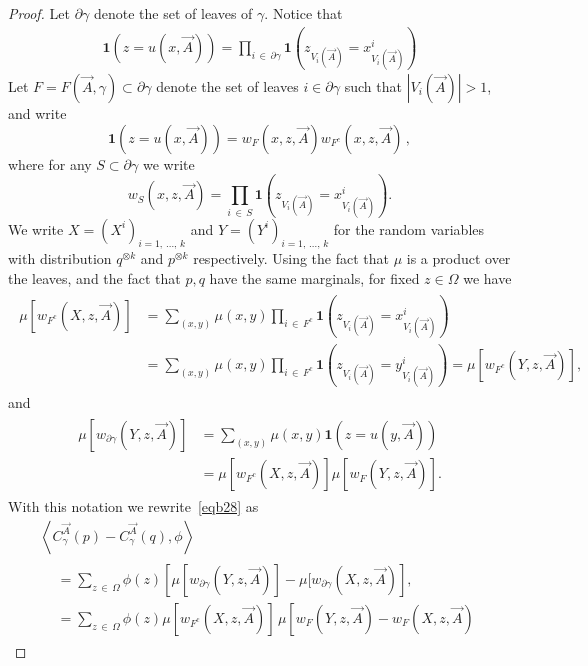 \documentclass[AHL,Unicode,longabstracts,published]{cedram}
\newcommand{\ind}{\mathbf{1}}
\let\g=\gamma
\let\O=\Omega
\begin{document}
\begin{proof}
Let $\partial\g$ denote the set of leaves of $\g$. Notice that
\begin{gather*}
\ind(z=u(x,\vec A)) =
\prod_{i\,\in\,\partial \g}
\ind(z_{V_i(\vec A)}=x^i_{V_i(\vec A)})
\end{gather*}
Let $F=F(\vec A,\g)\subset \partial \g$ denote the set of leaves $i\in \partial \g$ such that $|V_i(\vec A)|> 1$, and write
\[
\ind(z=u(x,\vec A)) = w_F (x,z,\vec A) w_{F^c}(x,z,\vec A)\,,
\]
where for any $S\subset \partial \g$ we write
\begin{equation}\label{defwS}
w_S(x,z,\vec A) = \prod_{i\,\in\,S}
\ind(z_{V_i(\vec A)}=x^i_{V_i(\vec A)}).
\end{equation}
We write $X=(X^i)_{i=1,\,\dots,\,k}$ and $Y=(Y^i)_{i=1,\,\dots,\,k}$ for the random variables with distribution $q^{\otimes k}$ and $p^{\otimes k}$ respectively. Using the fact that $\mu$ is a product over the leaves, and the fact that $p,q$ have the same marginals, for fixed $z\in\O$ we have
\begin{align}\label{eq282a}
\begin{split}
\mu\left[w_{F^c} \left(X,z,\vec A\right)\right]&=\sum_{(x,y)}\mu(x,y) \prod_{i\,\in\, F^c}
\ind\left(z_{V_i(\vec A)}=x^i_{V_i(\vec A)}\right) \\
&= \sum_{(x,y)}\mu(x,y) \prod_{i\,\in\,F^c}
\ind\left(z_{V_i(\vec A)}=y^i_{V_i(\vec A)}\right) =
\mu\left[w_{F^c} (Y,z,\vec A)\right],
\end{split}
\end{align}
and
\begin{align}\label{eq282}
\begin{split}
\mu\left[w_{\partial \g}\left(Y,z,\vec A\right)\right]&=\sum_{(x,y)}\mu(x,y)
\ind\left(z=u(y,\vec A)\right)\\
&=\mu\left[w_{F^c} \left(X,z,\vec A\right)\right]\mu\left[w_F \left(Y,z,\vec A\right)\right].
\end{split}
\end{align}
With this notation we rewrite~\eqref{eqb28} as
\begin{multline}\label{eqbb28}
\left\langle C^{\vec A}_{\gamma}(p)-C^{\vec A}_{\gamma}(q),\phi\right\rangle\\
\begin{aligned}
&=
\sum_{z\,\in\,\Omega} \phi(z) \left[
\mu[w_{\partial \g}\left(Y,z,\vec A\right)] - \mu[w_{\partial \g}\left(X,z,\vec A\right)\right],
\\
&=
\sum_{z\,\in\,\Omega} \phi(z)
\mu\left[w_{F^c} \left(X,z,\vec A\right)\right]\,\mu\left[w_F \left(Y,z,\vec A\right)-w_F \left(X,z,\vec A\right)

\end{aligned}
\end{multline}
\end{proof}
\end{document}
